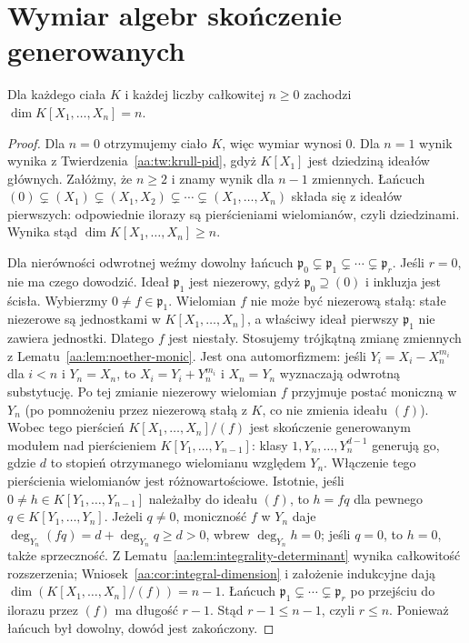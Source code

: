 \section{Wymiar algebr skończenie generowanych}
\begin{twierdzenie}\label{aa:tw:polynomial-krull-dimension}
Dla każdego ciała $K$ i każdej liczby całkowitej $n\ge0$
zachodzi $\dim K[X_1,\ldots,X_n]=n$.
\end{twierdzenie}
\begin{proof}
Dla $n=0$ otrzymujemy ciało $K$, więc wymiar wynosi $0$.
Dla $n=1$ wynik wynika z
Twierdzenia~\ref{aa:tw:krull-pid}, gdyż $K[X_1]$
jest dziedziną ideałów głównych. Załóżmy, że $n\ge2$
i znamy wynik dla $n-1$ zmiennych.
Łańcuch
$(0)\subsetneq(X_1)\subsetneq(X_1,X_2)\subsetneq\cdots
\subsetneq(X_1,\ldots,X_n)$
składa się z ideałów pierwszych: odpowiednie ilorazy
są pierścieniami wielomianów, czyli dziedzinami.
Wynika stąd $\dim K[X_1,\ldots,X_n]\ge n$.

Dla nierówności odwrotnej weźmy dowolny łańcuch
$\mathfrak p_0\subsetneq\mathfrak p_1\subsetneq\cdots
\subsetneq\mathfrak p_r$. Jeśli $r=0$, nie ma czego dowodzić.
Ideał $\mathfrak p_1$ jest niezerowy, gdyż
$\mathfrak p_0\supseteq(0)$ i inkluzja jest ścisła.
Wybierzmy $0\ne f\in\mathfrak p_1$. Wielomian $f$
nie może być niezerową stałą: stałe niezerowe są jednostkami
w $K[X_1,\ldots,X_n]$, a właściwy ideał pierwszy
$\mathfrak p_1$ nie zawiera jednostki. Dlatego $f$
jest niestały. Stosujemy trójkątną zmianę zmiennych z
Lematu~\ref{aa:lem:noether-monic}. Jest ona automorfizmem:
jeśli $Y_i=X_i-X_n^{m_i}$ dla $i<n$ i $Y_n=X_n$, to
$X_i=Y_i+Y_n^{m_i}$ i $X_n=Y_n$ wyznaczają odwrotną
substytucję. Po tej zmianie niezerowy wielomian $f$
przyjmuje postać moniczną w $Y_n$ (po pomnożeniu przez
niezerową stałą z $K$, co nie zmienia ideału $(f)$). Wobec tego pierścień
$K[X_1,\ldots,X_n]/(f)$ jest skończenie generowanym
modułem nad pierścieniem $K[Y_1,\ldots,Y_{n-1}]$:
klasy $1,Y_n,\ldots,Y_n^{d-1}$ generują go, gdzie $d$
to stopień otrzymanego wielomianu względem $Y_n$.
Włączenie tego pierścienia wielomianów jest różnowartościowe.
Istotnie, jeśli $0\ne h\in K[Y_1,\ldots,Y_{n-1}]$
należałby do ideału $(f)$, to $h=fq$ dla pewnego
$q\in K[Y_1,\ldots,Y_n]$. Jeżeli $q\ne0$, moniczność
$f$ w $Y_n$ daje $\deg_{Y_n}(fq)=d+\deg_{Y_n}q
\ge d>0$, wbrew $\deg_{Y_n}h=0$; jeśli $q=0$,
to $h=0$, także sprzeczność.
Z Lematu~\ref{aa:lem:integrality-determinant} wynika
całkowitość rozszerzenia; Wniosek~\ref{aa:cor:integral-dimension}
i założenie indukcyjne dają
$\dim(K[X_1,\ldots,X_n]/(f))=n-1$.
Łańcuch $\mathfrak p_1\subsetneq\cdots\subsetneq\mathfrak p_r$
po przejściu do ilorazu przez $(f)$ ma długość $r-1$.
Stąd $r-1\le n-1$, czyli $r\le n$.
Ponieważ łańcuch był dowolny, dowód jest zakończony.
\end{proof}

